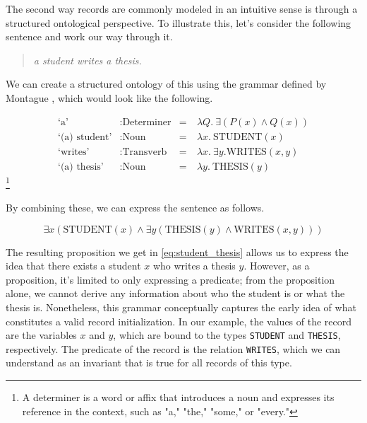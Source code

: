 The second way records are commonly modeled in an intuitive sense is through a structured ontological perspective. To illustrate this, let's consider the following sentence and work our way through it. 

\begin{center}
  \begin{quote}
    \textit{a student writes a thesis.}
  \end{quote}
\end{center}

We can create a structured ontology of this using the grammar defined by Montague \cite{montague1970english}, which would look like the following. 

\[
  \begin{aligned}
    \text{`a'} & : \text{Determiner}  & = &\  \lambda Q.\ \exists (P(x) \land Q(x)) \\
    \text{`(a) student'} & : \text{Noun}  & = &\  \lambda x.\ \text{STUDENT}(x) \\
    \text{`writes'} & : \text{Transverb}  & = &\  \lambda x.\ \exists y. \text{WRITES}(x, y) \\
    \text{`(a) thesis'} & : \text{Noun}  & = &\  \lambda y.\ \text{THESIS}(y) 
  \end{aligned}
\]\footnote{A determiner is a word or affix that introduces a noun and expresses its reference in the context, such as "a," "the," "some," or "every."}

By combining these, we can express the sentence as follows. 

\begin{equation}\label{eq:student_thesis}
  \exists x (\text{STUDENT}(x) \land \exists y (\text{THESIS}(y) \land \text{WRITES}(x, y)))
\end{equation}

The resulting proposition we get in \ref{eq:student_thesis} allows us to express the idea that there exists a student $x$ who writes a thesis $y$. However, as a proposition, it's limited to only expressing a predicate; from the proposition alone, we cannot derive any information about who the student is or what the thesis is. Nonetheless, this grammar conceptually captures the early idea of what constitutes a valid record initialization. In our example, the values of the record are the variables $x$ and $y$, which are bound to the types \texttt{STUDENT} and \texttt{THESIS}, respectively. The predicate of the record is the relation \texttt{WRITES}, which we can understand as an invariant that is true for all records of this type. 

